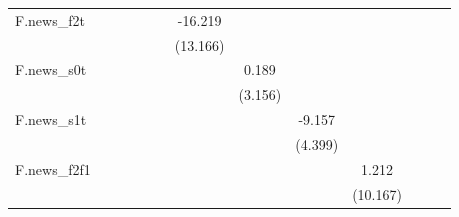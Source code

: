 {\begin{tabular}{l*{12}{c}}
\addlinespace
F.news\_f2t  &                     &                     &                     &                     &                     &     -16.219         &                     &                     &                     &                     &                     &                     \\
            &                     &                     &                     &                     &                     &    (13.166)         &                     &                     &                     &                     &                     &                     \\
\addlinespace
F.news\_s0t  &                     &                     &                     &                     &                     &                     &       0.189         &                     &                     &                     &                     &                     \\
            &                     &                     &                     &                     &                     &                     &     (3.156)         &                     &                     &                     &                     &                     \\
\addlinespace
F.news\_s1t  &                     &                     &                     &                     &                     &                     &                     &      -9.157\sym{**} &                     &                     &                     &                     \\
            &                     &                     &                     &                     &                     &                     &                     &     (4.399)         &                     &                     &                     &                     \\
\addlinespace
F.news\_f2f1 &                     &                     &                     &                     &                     &                     &                     &                     &       1.212         &                     &                     &                     \\
            &                     &                     &                     &                     &                     &                     &                     &                     &    (10.167)         &                     &                     &                     \\

\end{tabular}}
